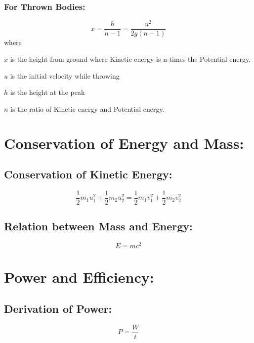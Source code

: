 \documentclass[a4paper]{report}
\begin{document}
            \subsubsection{For Thrown Bodies:}  
                \begin{equation}
                    x = \frac{h}{n - 1} = \frac{u^2}{2g(n - 1)}
                \end{equation}
                where 
                \begin{description}
                    \item $x$ is the height from ground where Kinetic energy is n-times the Potential energy,
                    \item $u$ is the initial velocity while throwing
                    \item $h$ is the height at the peak
                    \item $n$ is the ratio of Kinetic energy and Potential energy.
                \end{description}
    \section{Conservation of Energy and Mass: }
        \subsection{Conservation of Kinetic Energy: }
            \begin{equation}
                \frac{1}{2} m_1 u_1^2 + \frac{1}{2} m_2 u_2^2 = \frac{1}{2} m_1 v_1^2 + \frac{1}{2} m_2 v_2^2
            \end{equation}
        \subsection{Relation between Mass and Energy: }
            \begin{equation}
                E = mc^2
            \end{equation}
    \section{Power and Efficiency: }
        \subsection{Derivation of Power: }
            \begin{equation}
                P = \frac{W}{t}
            \end{equation}
\end{document}
